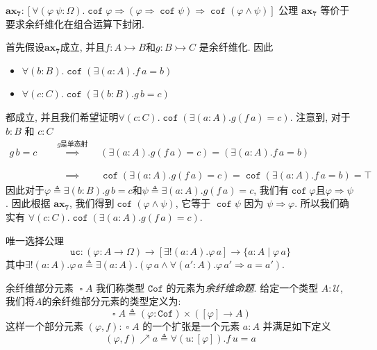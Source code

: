 \documentclass[aspectratio=169,xcolor=dvipsnames]{beamer}
\newcommand\calU{\mathcal{U}}
\newcommand{\ax}[1]{\mathbf{ax_{#1}}}
\newcommand\uc{\mathtt{uc}}
\newcommand\Cof{\mathtt{Cof}}
\DeclareMathOperator\cof{\mathtt{cof}}
\DeclareMathOperator\cofibpart{\square}
\begin{document}
\begin{frame}[shrink]{$\ax{7}:[\forall(\varphi\:\psi:\Omega).\cof\varphi\Rightarrow(\varphi\Rightarrow\cof\psi)\Rightarrow\cof(\varphi\land\psi)]$}
  公理 $\ax{7}$ 等价于要求余纤维化在组合运算下封闭.

  \bigskip
  首先假设$\ax{7}$成立, 并且$f:A\rightarrowtail B$和$g:B\rightarrowtail C$ 是余纤维化. 因此
  \begin{itemize}
    \item $\forall(b:B).\cof(\exists(a:A).f\,a=b)$
    \item $\forall(c:C).\cof(\exists(b:B).g\,b=c)$
  \end{itemize}
  都成立, 并且我们希望证明$\forall(c:C).\cof(\exists(a:A).g(f\,a)=c)$. 注意到, 对于 $b:B$ 和 $c:C$
  \begin{align*}
    g\,b=c \quad&\stackrel{g\text{是单态射}}{\implies}\quad (\exists(a:A).g(f\,a)=c) = (\exists(a:A).f\,a=b) \\
    &\stackrel{\phantom{g\text{是单态射}}}{\implies}\quad \cof(\exists(a:A).g(f\,a)=c) = \cof(\exists(a:A).f\,a=b) = \top
  \end{align*}
  因此对于$\varphi\triangleq\exists(b:B).g\,b=c$和$\psi\triangleq\exists(a:A).g(f\,a)=c$, 我们有$\cof\varphi$且$\varphi\Rightarrow\psi$. 因此根据 $\ax{7}$, 我们得到$\cof(\varphi\land\psi)$, 它等于 $\cof\psi$ 因为 $\psi\Rightarrow\varphi$. 所以我们确实有 $\forall(c:C).\cof(\exists(a:A).g(f\,a)=c)$.
\end{frame}

\begin{frame}{唯一选择公理}
  \[
  \uc : (\varphi : A \to \Omega) \to [\exists!(a:A).\varphi\,a]\to\{a:A\mid\varphi\,a\}
  \]
  其中$\exists!(a:A).\varphi\,a\triangleq\exists(a:A).(\varphi\,a\land\forall(a':A).\varphi\,a'\Rightarrow a=a')$.
\end{frame}

\begin{frame}{余纤维部分元素 $\cofibpart A$}
  我们称类型 $\Cof$ 的元素为\emph{余纤维命题}. 给定一个类型 $A:\calU$, 我们将$A$的余纤维部分元素的类型定义为:
  \[
  \cofibpart A \triangleq (\varphi : \Cof) \times ([\varphi]\to A)
  \]
  这样一个部分元素 $(\varphi,f):\cofibpart A$ 的一个扩张是一个元素 $a:A$ 并满足如下定义
  \[
  (\varphi,f) \nearrow a \triangleq \forall(u:[\varphi]).f\,u=a
  \]
\end{frame}
\end{document}
